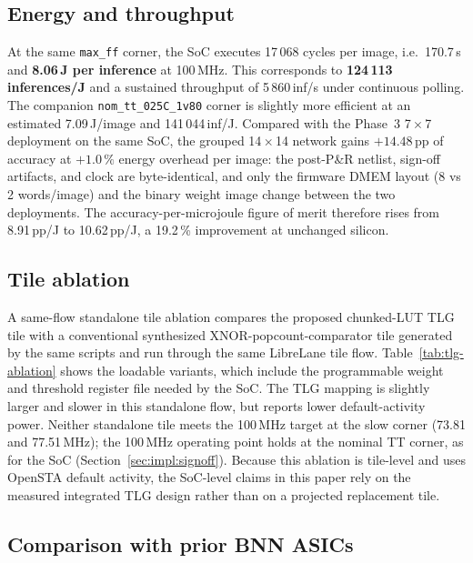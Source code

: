 \documentclass[conference]{IEEEtran}
\begin{document}
\subsection{Energy and throughput}
\label{sec:eval:energy}

At the same \texttt{max\_ff} corner, the SoC executes 17\,068 cycles
per image, i.e.\ 170.7\,\textmu s and \textbf{8.06\,\textmu J per
  inference} at 100\,MHz. This corresponds to \textbf{124\,113
  inferences/J} and a sustained throughput of 5\,860\,inf/s under
continuous polling. The companion \texttt{nom\_tt\_025C\_1v80} corner
is slightly more efficient at an estimated 7.09\,\textmu J/image and
141\,044\,inf/J. Compared with the Phase~3 7\,\(\times\)\,7
deployment on the same SoC, the grouped 14\,\(\times\)\,14 network
gains $+14.48$\,pp of accuracy at $+1.0\,\%$ energy overhead per
image: the post-P\&R netlist, sign-off artifacts, and clock are
byte-identical, and only the firmware DMEM layout (8 vs 2 words/image)
and the binary weight image change between the two deployments. The
accuracy-per-microjoule figure of merit therefore rises from
8.91\,pp/\textmu J to 10.62\,pp/\textmu J, a 19.2\,\% improvement at
unchanged silicon.

\subsection{Tile ablation}
\label{sec:eval:ablation}

A same-flow standalone tile ablation compares the proposed
chunked-LUT TLG tile with a conventional synthesized
XNOR-popcount-comparator tile generated by the same scripts and run
through the same LibreLane tile flow. Table~\ref{tab:tlg-ablation}
shows the loadable variants, which include the programmable weight
and threshold register file needed by the SoC. The TLG mapping is
slightly larger and slower in this standalone flow, but reports
lower default-activity power. Neither standalone tile meets the
100\,MHz target at the slow corner (73.81 and 77.51\,MHz); the
100\,MHz operating point holds at the nominal TT corner, as for the
SoC (Section~\ref{sec:impl:signoff}). Because this ablation is tile-level
and uses OpenSTA default activity, the SoC-level claims in this
paper rely on the measured integrated TLG design rather than on a
projected replacement tile.


\subsection{Comparison with prior BNN ASICs}
\label{sec:eval:comparison}

\end{document}
